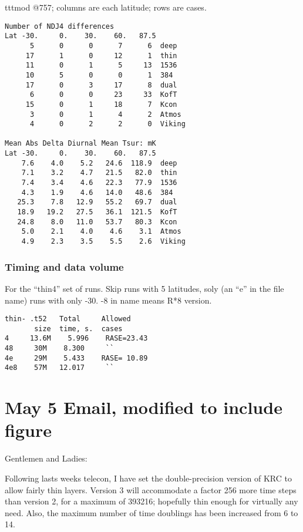 \documentclass{article}  %
\begin{document}
tttmod @757; columns are each latitude; rows are cases.
\vspace{-3.mm} 
\begin{verbatim}
Number of NDJ4 differences
Lat -30.     0.    30.    60.   87.5
      5      0      0      7      6  deep
     17      1      0     12      1  thin
     11      0      1      5     13  1536
     10      5      0      0      1  384
     17      0      3     17      8  dual
      6      0      0     23     33  KofT
     15      0      1     18      7  Kcon
      3      0      1      4      2  Atmos
      4      0      2      2      0  Viking

Mean Abs Delta Diurnal Mean Tsur: mK
Lat -30.     0.    30.    60.   87.5
    7.6    4.0    5.2   24.6  118.9  deep
    7.1    3.2    4.7   21.5   82.0  thin
    7.4    3.4    4.6   22.3   77.9  1536
    4.3    1.9    4.6   14.0   48.6  384
   25.3    7.8   12.9   55.2   69.7  dual
   18.9   19.2   27.5   36.1  121.5  KofT
   24.8    8.0   11.0   53.7   80.3  Kcon
    5.0    2.1    4.0    4.6    3.1  Atmos
    4.9    2.3    3.5    5.5    2.6  Viking
\end{verbatim}  

\subsubsection{Timing and data volume}
For the ``thin4'' set of runs. Skip runs with 5 latitudes, soly (an ``e'' in the file name) runs with only -30\qd. -8 in name means R*8 version.
\vspace{-3.mm} 
\begin{verbatim}
thin- .t52   Total     Allowed
       size  time, s.  cases
4     13.6M    5.996    RASE=23.43
48     30M    8.300     ``
4e     29M    5.433    RASE= 10.89
4e8    57M   12.017     ``        
\end{verbatim}
 
\clearpage

\section{May 5 Email, modified to include figure} %

Gentlemen and Ladies:

Following lasts weeks telecon, I have set the double-precision version of
KRC to allow fairly thin layers. Version 3 will accommodate a factor 256 more
time steps than version 2, for a maximum of 393216; hopefully thin enough for
virtually any need. Also, the maximum number of time doublings has been
increased from 6 to 14.
\end{document}
